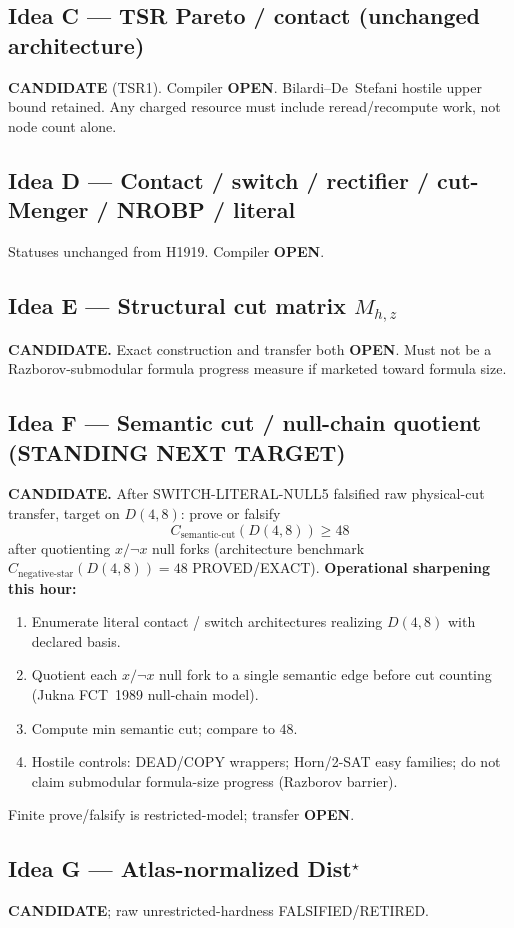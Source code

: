 \documentclass[11pt]{article}
\begin{document}
\subsection*{Idea C --- TSR Pareto / contact (unchanged architecture)}
\textbf{CANDIDATE} (TSR1). Compiler \textbf{OPEN}. Bilardi--De~Stefani hostile upper bound retained.
Any charged resource must include reread/recompute work, not node count alone.

\subsection*{Idea D --- Contact / switch / rectifier / cut-Menger / NROBP / literal}
Statuses unchanged from H1919. Compiler \textbf{OPEN}.

\subsection*{Idea E --- Structural cut matrix $M_{h,z}$}
\textbf{CANDIDATE.} Exact construction and transfer both \textbf{OPEN}.
Must not be a Razborov-submodular formula progress measure if marketed toward formula size.

\subsection*{Idea F --- Semantic cut / null-chain quotient (STANDING NEXT TARGET)}
\textbf{CANDIDATE.} After SWITCH-LITERAL-NULL5 falsified raw physical-cut transfer,
target on $D(4,8)$: prove or falsify
\[
C_{\mathrm{semantic\textrm{-}cut}}(D(4,8))\ge 48
\]
after quotienting $x/\neg x$ null forks (architecture benchmark
$C_{\mathrm{negative\textrm{-}star}}(D(4,8))=48$ PROVED/EXACT).
\textbf{Operational sharpening this hour:}
\begin{enumerate}
\item Enumerate literal contact / switch architectures realizing $D(4,8)$ with declared basis.
\item Quotient each $x/\neg x$ null fork to a single semantic edge before cut counting
  (Jukna FCT~1989 null-chain model).
\item Compute min semantic cut; compare to $48$.
\item Hostile controls: DEAD/COPY wrappers; Horn/2-SAT easy families; do not claim
  submodular formula-size progress (Razborov barrier).
\end{enumerate}
Finite prove/falsify is restricted-model; transfer \textbf{OPEN}.

\subsection*{Idea G --- Atlas-normalized Dist$^\star$}
\textbf{CANDIDATE}; raw unrestricted-hardness FALSIFIED/RETIRED.
\end{document}
